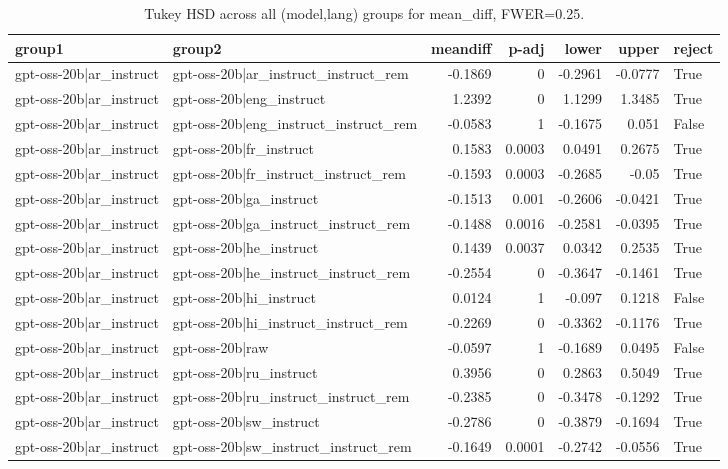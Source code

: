 \begin{table}
\caption{Tukey HSD across all (model,lang) groups for mean_diff, FWER=0.25.}
\label{tab:tukey_all_models_all_langs_mean_diff}
\begin{tabular}{l l r r r r l}
\toprule
group1 & group2 & meandiff & p-adj & lower & upper & reject \\
\midrule
gpt-oss-20b|ar_instruct & gpt-oss-20b|ar_instruct_instruct_rem & -0.1869 & 0 & -0.2961 & -0.0777 & True \\
gpt-oss-20b|ar_instruct & gpt-oss-20b|eng_instruct & 1.2392 & 0 & 1.1299 & 1.3485 & True \\
gpt-oss-20b|ar_instruct & gpt-oss-20b|eng_instruct_instruct_rem & -0.0583 & 1 & -0.1675 & 0.051 & False \\
gpt-oss-20b|ar_instruct & gpt-oss-20b|fr_instruct & 0.1583 & 0.0003 & 0.0491 & 0.2675 & True \\
gpt-oss-20b|ar_instruct & gpt-oss-20b|fr_instruct_instruct_rem & -0.1593 & 0.0003 & -0.2685 & -0.05 & True \\
gpt-oss-20b|ar_instruct & gpt-oss-20b|ga_instruct & -0.1513 & 0.001 & -0.2606 & -0.0421 & True \\
gpt-oss-20b|ar_instruct & gpt-oss-20b|ga_instruct_instruct_rem & -0.1488 & 0.0016 & -0.2581 & -0.0395 & True \\
gpt-oss-20b|ar_instruct & gpt-oss-20b|he_instruct & 0.1439 & 0.0037 & 0.0342 & 0.2535 & True \\
gpt-oss-20b|ar_instruct & gpt-oss-20b|he_instruct_instruct_rem & -0.2554 & 0 & -0.3647 & -0.1461 & True \\
gpt-oss-20b|ar_instruct & gpt-oss-20b|hi_instruct & 0.0124 & 1 & -0.097 & 0.1218 & False \\
gpt-oss-20b|ar_instruct & gpt-oss-20b|hi_instruct_instruct_rem & -0.2269 & 0 & -0.3362 & -0.1176 & True \\
gpt-oss-20b|ar_instruct & gpt-oss-20b|raw & -0.0597 & 1 & -0.1689 & 0.0495 & False \\
gpt-oss-20b|ar_instruct & gpt-oss-20b|ru_instruct & 0.3956 & 0 & 0.2863 & 0.5049 & True \\
gpt-oss-20b|ar_instruct & gpt-oss-20b|ru_instruct_instruct_rem & -0.2385 & 0 & -0.3478 & -0.1292 & True \\
gpt-oss-20b|ar_instruct & gpt-oss-20b|sw_instruct & -0.2786 & 0 & -0.3879 & -0.1694 & True \\
gpt-oss-20b|ar_instruct & gpt-oss-20b|sw_instruct_instruct_rem & -0.1649 & 0.0001 & -0.2742 & -0.0556 & True \\

\end{tabular}
\end{table}
